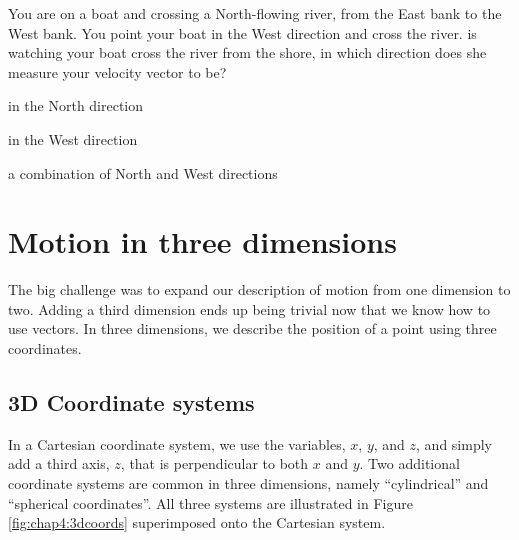 \begin{checkpointMC}{You are on a boat and crossing a North-flowing river, from the East bank to the West bank. You point your boat in the West direction and cross the river. \chloe is watching your boat cross the river from the shore, in which direction does she measure your velocity vector to be?}
\item in the North direction
\item in the West direction
\item a combination of North and West directions
\end{checkpointMC}


\section{Motion in three dimensions}
The big challenge was to expand our description of motion from one dimension to two. Adding a third dimension ends up being trivial now that we know how to use vectors. In three dimensions, we describe the position of a point using three coordinates.

\subsection{3D Coordinate systems}
In a Cartesian coordinate system, we use the variables, $x$, $y$, and $z$, and simply add a third axis, $z$, that is perpendicular to both $x$ and $y$. Two additional coordinate systems are common in three dimensions, namely ``cylindrical'' and ``spherical coordinates''. All three systems are illustrated in Figure \ref{fig:chap4:3dcoords} superimposed onto the Cartesian system.

